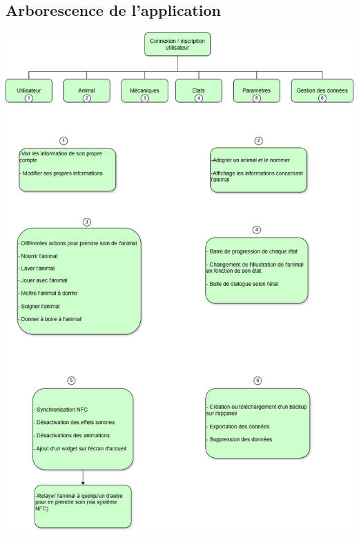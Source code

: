 \documentclass{conception_detaillee}
\begin{document}
\begin{itemize}[label=\textbullet]
\section{Arborescence de l'application}
\includegraphics[height=0.8\paperheight]{images/ArborescenceL2i1.png}

\end{itemize}
\end{document}
